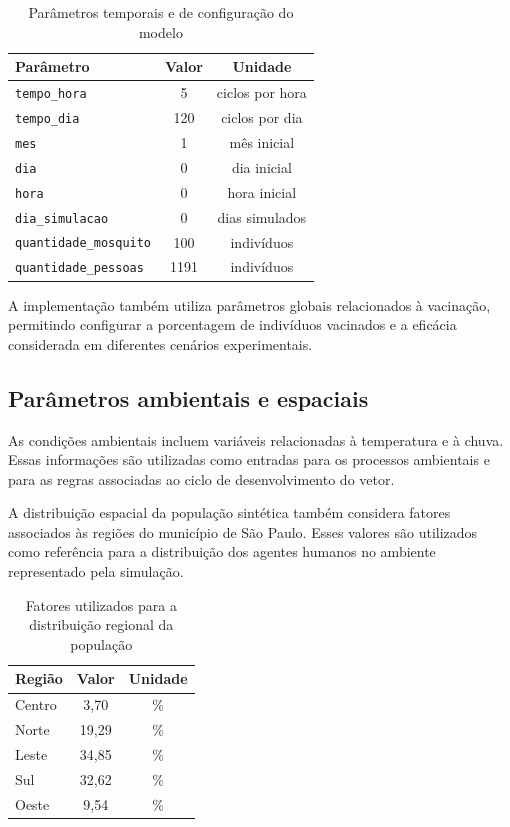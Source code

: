 \begin{table}[htb]
    \centering
    \caption{Parâmetros temporais e de configuração do modelo}
    \label{tab:parametros-tempo}
    \begin{tabular}{l c c}
        \hline
        \textbf{Parâmetro} & \textbf{Valor} & \textbf{Unidade} \\
        \hline
        \texttt{tempo\_hora} & 5 & ciclos por hora \\
        \texttt{tempo\_dia} & 120 & ciclos por dia \\
        \texttt{mes} & 1 & mês inicial \\
        \texttt{dia} & 0 & dia inicial \\
        \texttt{hora} & 0 & hora inicial \\
        \texttt{dia\_simulacao} & 0 & dias simulados \\
        \texttt{quantidade\_mosquito} & 100 & indivíduos \\
        \texttt{quantidade\_pessoas} & 1191 & indivíduos \\
        \hline
    \end{tabular}
\end{table}

A implementação também utiliza parâmetros globais relacionados à vacinação, permitindo configurar a porcentagem de indivíduos vacinados e a eficácia considerada em diferentes cenários experimentais.

\subsection{Parâmetros ambientais e espaciais}

As condições ambientais incluem variáveis relacionadas à temperatura e à chuva. Essas informações são utilizadas como entradas para os processos ambientais e para as regras associadas ao ciclo de desenvolvimento do vetor.

A distribuição espacial da população sintética também considera fatores associados às regiões do município de São Paulo. Esses valores são utilizados como referência para a distribuição dos agentes humanos no ambiente representado pela simulação.

\begin{table}[htb]
    \centering
    \caption{Fatores utilizados para a distribuição regional da população}
    \label{tab:distribuicao-regional}
    \begin{tabular}{l c c}
        \hline
        \textbf{Região} & \textbf{Valor} & \textbf{Unidade} \\
        \hline
        Centro & 3,70 & \% \\
        Norte & 19,29 & \% \\
        Leste & 34,85 & \% \\
        Sul & 32,62 & \% \\
        Oeste & 9,54 & \% \\
        \hline
    \end{tabular}
\end{table}

